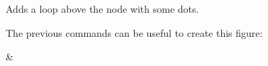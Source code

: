 \documentclass[a4paper,doc2]{ltxdoc} %
\begin{document}
{\begin{command}{\zxLoopAboveDots{}}
  Adds a loop above the node with some dots.
\begin{codeexample}[width=3cm]
\begin{ZX}
  \zxX{\alpha} \zxLoopAboveDots{}
\end{ZX}
\end{codeexample}
\end{command}

\noindent The previous commands can be useful to create this figure:
\begin{codeexample}[width=0pt]%
\begin{ZX}
   \zxX{\alpha} \zxLoopAboveDots{} \middleManyDots{} \ar[r,o'={a=75}]
      & \zxX{\beta} \zxLoopAboveDots{} 
\end{ZX}
\end{codeexample}


}
\end{document}
